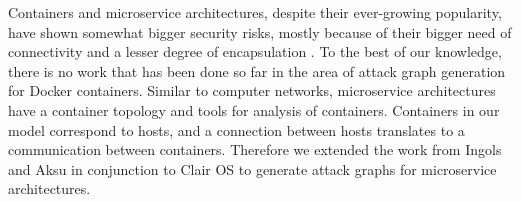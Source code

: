 Containers and microservice architectures, despite their ever-growing popularity, have shown somewhat bigger security risks, mostly because of their bigger need of connectivity and a lesser degree of encapsulation \cite{combe2016docker, dragoni2017microservices}. To the best of our knowledge, there is no work that has been done so far in the area of attack graph generation for Docker containers. Similar to computer networks, microservice architectures have a container topology and tools for analysis of containers. Containers in our model correspond to hosts, and a connection between hosts translates to a communication between containers. Therefore we extended the work from Ingols \cite{ingols2006practical} and Aksu \cite{aksu2018automated} in conjunction to Clair OS  to generate attack graphs for microservice architectures. 


